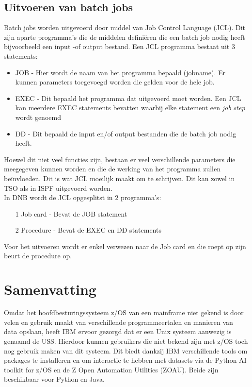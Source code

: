\subsection{Uitvoeren van batch jobs}
Batch jobs worden uitgevoerd door middel van Job Control Language (JCL). Dit zijn aparte programma's die de middelen definiëren die een batch job nodig heeft bijvoorbeeld een input -of output bestand. Een JCL programma bestaat uit 3 statements: 
\begin{itemize}
    \item JOB - Hier wordt de naam van het programma bepaald (jobname). Er kunnen parameters toegevoegd worden die gelden voor de hele job.
    \item EXEC - Dit bepaald het programma dat uitgevoerd moet worden. Een JCL kan meerdere EXEC statements bevatten waarbij elke statement een \textit{job step} wordt genoemd
    \item DD - Dit bepaald de input en/of output bestanden die de batch job nodig heeft.
\end{itemize}
Hoewel dit niet veel functies zijn, bestaan er veel verschillende parameters die meegegeven kunnen worden en die de werking  van het programma zullen beïnvloeden. Dit is wat JCL moeilijk maakt om te schrijven. Dit kan zowel in TSO als in ISPF uitgevoerd worden. \autocite{IBM} \\

In DNB wordt de JCL opgesplitst in 2 programma's:

\begin{itemize}
    \item[1] Job card - Bevat de JOB statement
    \item[2] Procedure - Bevat de EXEC en DD statements
\end{itemize}
Voor het uitvoeren wordt er enkel verwezen naar de Job card en die roept op zijn beurt de procedure op. \\

\newpage
\section{Samenvatting}
Omdat het hoofdbesturingssysteem z/OS van een mainframe niet gekend is door velen en gebruik maakt van verschillende programmeertalen en manieren van data opslaan, heeft IBM ervoor gezorgd dat er een Unix systeem aanwezig is genaamd de USS. Hierdoor kunnen gebruikers die niet bekend zijn met z/OS toch nog gebruik maken van dit systeem. Dit biedt dankzij IBM verschillende tools om packages te installeren en om interactie te hebben met datasets via de Python AI toolkit for z/OS en de Z Open Automation Utilities (ZOAU). Beide zijn beschikbaar voor Python en Java. \\

